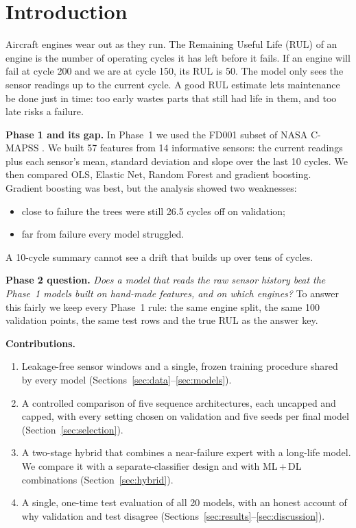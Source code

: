 \documentclass[conference]{IEEEtran}
\begin{document}
\section{Introduction}
Aircraft engines wear out as they run. The Remaining Useful Life (RUL) of an engine is the number of operating cycles it has left before it fails. If an engine will fail at cycle 200 and we are at cycle 150, its RUL is 50. The model only sees the sensor readings up to the current cycle. A good RUL estimate lets maintenance be done just in time: too early wastes parts that still had life in them, and too late risks a failure.

\textbf{Phase 1 and its gap.} In Phase~1 we used the FD001 subset of NASA C-MAPSS \cite{saxena2008damage}. We built 57 features from 14 informative sensors: the current readings plus each sensor's mean, standard deviation and slope over the last 10 cycles. We then compared OLS, Elastic Net, Random Forest and gradient boosting. Gradient boosting was best, but the analysis showed two weaknesses:
\begin{itemize}
  \item close to failure the trees were still 26.5 cycles off on validation;
  \item far from failure every model struggled.
\end{itemize}
A 10-cycle summary cannot see a drift that builds up over tens of cycles.

\textbf{Phase 2 question.} \emph{Does a model that reads the raw sensor history beat the Phase~1 models built on hand-made features, and on which engines?} To answer this fairly we keep every Phase~1 rule: the same engine split, the same 100 validation points, the same test rows and the true RUL as the answer key.

\textbf{Contributions.}
\begin{enumerate}
  \item Leakage-free sensor windows and a single, frozen training procedure shared by every model (Sections~\ref{sec:data}--\ref{sec:models}).
  \item A controlled comparison of five sequence architectures, each uncapped and capped, with every setting chosen on validation and five seeds per final model (Section~\ref{sec:selection}).
  \item A two-stage hybrid that combines a near-failure expert with a long-life model. We compare it with a separate-classifier design and with ML\,+\,DL combinations (Section~\ref{sec:hybrid}).
  \item A single, one-time test evaluation of all 20 models, with an honest account of why validation and test disagree (Sections~\ref{sec:results}--\ref{sec:discussion}).
\end{enumerate}
\end{document}
